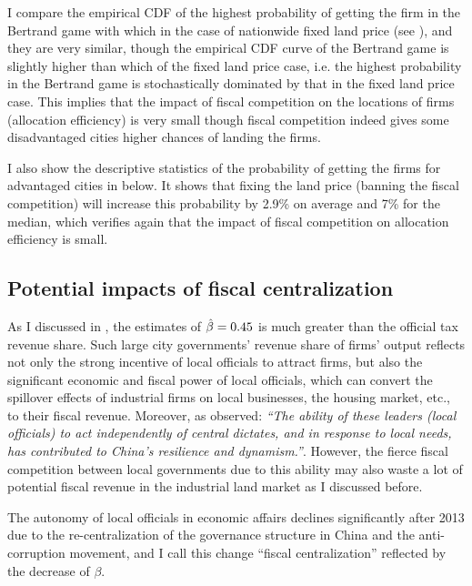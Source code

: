 I compare the empirical CDF of the highest probability
of getting the firm in the Bertrand game with which
in the case of nationwide fixed land price (see ),
and they are very similar,
though the empirical CDF curve of the Bertrand game is slightly higher than which
of the fixed land price case, i.e. the highest probability in the Bertrand game is
stochastically dominated by that in the fixed land price case.
This implies that
the impact of fiscal competition on the locations of firms (allocation efficiency) is very small
though fiscal competition indeed gives some disadvantaged cities higher chances
of landing the firms.

I also show the descriptive statistics of the
probability of getting the firms for advantaged cities in
 below. It shows that
fixing the land price (banning the fiscal competition) will increase this probability by
2.9\% on average and 7\% for the median,
which verifies again that the impact of fiscal competition on allocation efficiency is small.



\subsection{Potential impacts of fiscal centralization}
As I discussed in , the estimates of $\hat{\beta} = 0.45$
is much greater than the official tax revenue share. Such large city governments'
revenue share of firms' output reflects not only the strong incentive of
local officials to attract firms, but also the significant economic and fiscal power of
local officials, which can convert the spillover effects of industrial firms on local businesses,
the housing market, etc., to their fiscal revenue. Moreover, as \cite{kroeber2020china} observed:
\textit{``The ability of these leaders (local officials) to act independently
    of central dictates, and in response to local needs, has contributed to China's
    resilience and dynamism.''}. However, the fierce fiscal competition between local
governments due to this ability may also waste a lot of potential fiscal revenue
in the industrial land market as I discussed before.

The autonomy of local officials in economic affairs declines significantly after 2013
due to the re-centralization of the governance structure in China and the anti-corruption movement,
and I call this change ``fiscal centralization'' reflected by the decrease of $\beta$.

